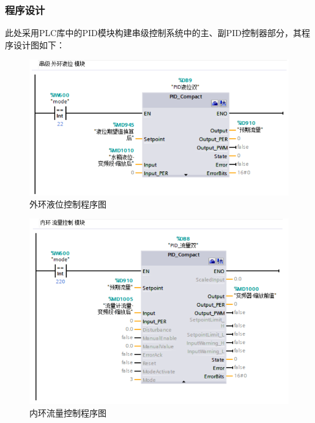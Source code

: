 \documentclass[UTF8]{article}
\begin{document}
\subsubsection{程序设计}
此处采用PLC库中的PID模块构建串级控制系统中的主、副PID控制器部分，其程序设计图如下：
\begin{figure}[H]
    \centering %
    \includegraphics[width=.8\textwidth]{figure/串级-外环液位-模块.PNG} 
    \caption{外环液位控制程序图} %
\end{figure}
\begin{figure}[H]
    \centering %
    \includegraphics[width=.8\textwidth]{figure/串级-内环流量-模块.PNG} 
    \caption{内环流量控制程序图} %
\end{figure}
\end{document}
